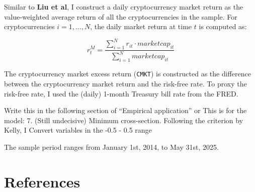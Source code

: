\documentclass[
  11pt,
  a4paper,
  openany]{scrreprt}
\begin{document}
Similar to \textbf{Liu et al}, I construct a daily cryptocurrency market
return as the value-weighted average return of all the cryptocurrencies
in the sample. For cryptocurrencies \(i = 1, ..., N\), the daily market
return at time \(t\) is computed as:

\[
r_t^M = \frac{\sum_{i=1}^N r_{it} \cdot marketcap_{it}}
             {\sum_{i=1}^N marketcap_{it} }
\]

The cryptocurrency market excess return (\texttt{CMKT}) is constructed
as the difference between the cryptocurrency market return and the
risk-free rate. To proxy the risk-free rate, I used the (daily) 1-month
Treasury bill rate from the FRED.

Write this in the following section of ``Empirical application'' or This
is for the model: 7. (Still undecisive) Minimum cross-section. Following
the criterion by Kelly, I Convert variables in the -0.5 - 0.5 range

The sample period ranges from January 1st, 2014, to May 31st, 2025.


\chapter*{References}\label{references}

\end{document}
